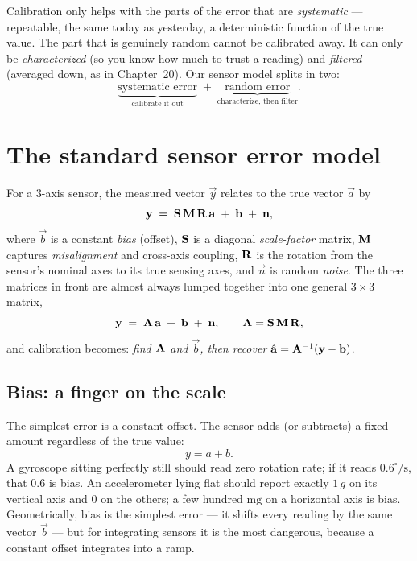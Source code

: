 Calibration only helps with the parts of the error that are \emph{systematic} --- repeatable, the same today as yesterday, a deterministic function of the true value. The part that is genuinely random cannot be calibrated away. It can only be
\emph{characterized} (so you know how much to trust a reading) and \emph{filtered}
(averaged down, as in Chapter~20). Our sensor model splits in two:
\[
  \underbrace{\text{systematic error}}_{\text{calibrate it out}}
  \;+\;
  \underbrace{\text{random error}}_{\text{characterize, then filter}}.
\]


\section{The standard sensor error model}
\label{ch35:error-model}

For a 3-axis sensor, the measured
vector $\vec{y}$ relates to the true vector $\vec{a}$ by
\begin{equation}
  \mathbf{y} \;=\; \mathbf{S}\,\mathbf{M}\,\mathbf{R}\,\mathbf{a} \;+\; \mathbf{b} \;+\; \mathbf{n},
  \label{ch35:full-model}
\end{equation}
where $\vec{b}$ is a constant \emph{bias} (offset), $\mathbf{S}$ is a diagonal
\emph{scale-factor} matrix, $\mathbf{M}$ captures \emph{misalignment} and
cross-axis coupling, $\mathbf{R}$ is the rotation from the sensor's nominal axes to
its true sensing axes, and $\vec{n}$ is random \emph{noise}. The three matrices
in front are almost always lumped together into one general $3\times3$ matrix,
\begin{equation}
  \mathbf{y} \;=\; \mathbf{A}\,\mathbf{a} \;+\; \mathbf{b} \;+\; \mathbf{n},
  \qquad \mathbf{A} = \mathbf{S}\,\mathbf{M}\,\mathbf{R},
  \label{ch35:lumped-model}
\end{equation}
and calibration becomes: \emph{find $\mathbf{A}$ and $\vec{b}$, then recover}
$\hat{\mathbf{a}} = \mathbf{A}^{-1}(\mathbf{y}-\mathbf{b})$.

\subsection{Bias: a finger on the scale}
\label{ch35:bias}

The simplest error is a constant offset. The sensor adds (or subtracts) a fixed
amount regardless of the true value:
\begin{equation}
  y = a + b.
  \label{ch35:bias-scalar}
\end{equation}
A gyroscope sitting perfectly still should read zero rotation rate; if it reads
$0.6^\circ/\mathrm{s}$, that $0.6$ is bias. An accelerometer lying flat should
report exactly $1\,g$ on its vertical axis and $0$ on the others; a few hundred
$\mathrm{mg}$ on a horizontal axis is bias. Geometrically, bias is the simplest error --- it shifts every reading by the same vector $\vec{b}$ --- but for integrating sensors it is the most dangerous, because a constant offset integrates into a ramp.

